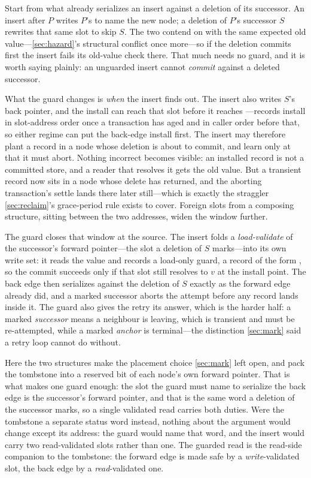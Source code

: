 \documentclass[11pt]{article}
\begin{document}
Start from what already serializes an insert against a deletion of its successor.
An insert after $P$ writes $P$'s  to name the new node; a deletion of
$P$'s successor $S$ rewrites that same slot to skip $S$. The two contend on
 with the same expected old value---\cref{sec:hazard}'s structural
conflict once more---so if the deletion commits first the insert fails its
old-value check there. That much needs no guard, and it is worth saying plainly:
an unguarded insert cannot \emph{commit} against a deleted successor.

What the guard changes is \emph{when} the insert finds out. The insert also writes
$S$'s back pointer, and the install can reach that slot before it reaches
---records install in slot-address order once a transaction has aged
and in caller order before that, so either regime can put the back-edge install
first. The insert may therefore plant a record in a node whose deletion is about
to commit, and learn only at  that it must abort. Nothing incorrect
becomes visible: an installed record is not a committed store, and a reader that
resolves it gets the old value. But a transient record now sits in a node whose
delete has returned, and the aborting transaction's settle lands there later
still---which is exactly the straggler \cref{sec:reclaim}'s grace-period rule
exists to cover. Foreign slots from a composing structure, sitting between the two
addresses, widen the window further.

The guard closes that window at the source. The insert folds a
\emph{load-validate} of the successor's forward pointer---the slot a deletion of
$S$ marks---into its own write set: it reads the value and records a load-only
guard, a record of the form , so the commit succeeds only if that slot
still resolves to $v$ at the install point. The back edge then serializes against
the deletion of $S$ exactly as the forward edge already did, and a marked
successor aborts the attempt before any record lands inside it. The guard also
gives the retry its answer, which is the harder half: a marked \emph{successor}
means a neighbour is leaving, which is transient and must be re-attempted, while a
marked \emph{anchor} is terminal---the distinction \cref{sec:mark} said a retry
loop cannot do without.

Here the two structures make the placement choice \cref{sec:mark} left open, and
pack the tombstone into a reserved bit of each node's own forward pointer. That is
what makes one guard enough: the slot the guard must name to serialize the back
edge is the successor's forward pointer, and that is the same word a deletion of
the successor marks, so a single validated read carries both duties. Were the
tombstone a separate status word instead, nothing about the argument would change
except its address: the guard would name that word, and the insert would carry two
read-validated slots rather than one. The guarded read is the read-side companion
to the tombstone: the forward edge is made safe by a \emph{write}-validated slot,
the back edge by a \emph{read}-validated one.
\end{document}
